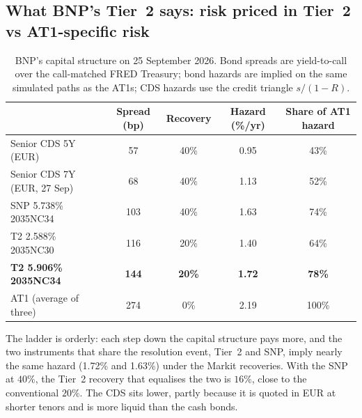\documentclass[11pt]{article}
\newcommand{\1}{\mathbf{1}}
\begin{document}
\subsection{What BNP's Tier~2 says: risk priced in Tier~2 vs AT1-specific risk}\label{sec:capstruct}
\begin{table}[H]
\centering
\begin{tabular}{lcccc}
\toprule
 & Spread (bp) & Recovery & Hazard (\%/yr) & Share of AT1 hazard \\
\midrule
Senior CDS 5Y (EUR) & 57 & 40\% & 0.95 & 43\% \\
Senior CDS 7Y (EUR, 27 Sep) & 68 & 40\% & 1.13 & 52\% \\
SNP 5.738\% 2035NC34 & 103 & 40\% & 1.63 & 74\% \\
T2 2.588\% 2035NC30 & 116 & 20\% & 1.40 & 64\% \\
\textbf{T2 5.906\% 2035NC34} & \textbf{144} & \textbf{20\%} & \textbf{1.72} & \textbf{78\%} \\
AT1 (average of three) & 274 & 0\% & 2.19 & 100\% \\
\bottomrule
\end{tabular}
\caption{BNP's capital structure on 25 September 2026. Bond spreads are
yield-to-call over the call-matched FRED Treasury; bond hazards are implied on the
same simulated paths as the AT1s; CDS hazards use the credit triangle $s/(1-R)$.}
\end{table}
The ladder is orderly: each step down the capital structure pays more, and the
two instruments that share the resolution event, Tier~2 and SNP, imply nearly
the same hazard (1.72\% and 1.63\%) under the Markit recoveries. With the SNP at
$40\%$, the Tier~2 recovery that equalises the two is $16\%$, close to the
conventional $20\%$. The CDS sits lower, partly because it is quoted in EUR at
shorter tenors and is more liquid than the cash bonds.
\end{document}
